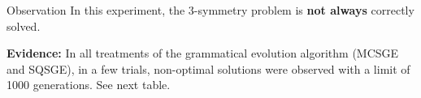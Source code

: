 \begin{frame}
\vspace*{2mm}
\begin{block}{
Observation
}
In this experiment, the 3-symmetry problem is {\bf not always} correctly solved.
 
{\bf Evidence:}
In all treatments of the grammatical evolution algorithm (MCSGE and SQSGE), 
in a few trials, non-optimal solutions were observed with a limit of 1000 generations.
See next table.
\end{block}
\end{frame}